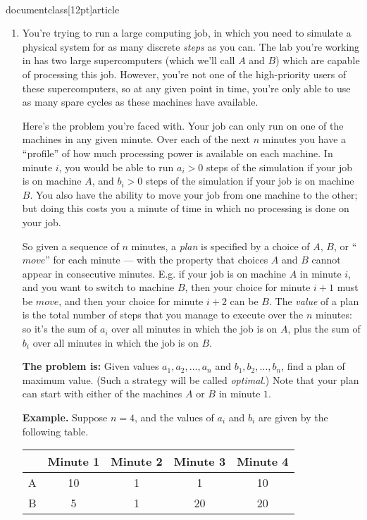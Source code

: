 \\documentclass[12pt]{article}
\begin{document}
\begin{enumerate}

\item

You're trying to run a large computing job, in which you
need to simulate a physical system for as many discrete
{\em steps} as you can.
The lab you're working in has two large supercomputers
(which we'll call $A$ and $B$) which are capable of
processing this job.
However, you're not one of the high-priority users of
these supercomputers, so at any given point in time,
you're only able to use as many spare cycles as these
machines have available.

Here's the problem you're faced with.
Your job can only run on one of the machines in any given minute.
Over each of the next $n$ minutes
you have a ``profile'' of how much processing power
is available on each machine.
In minute $i$, you would be able to run $a_i > 0 $ steps of
the simulation if your job is on machine $A$,
and $b_i > 0$ steps of the simulation if your job is on machine $B$.
You also have the ability to move your job from one machine
to the other; but doing this costs you a minute of time
in which no processing is done on your job.

So given a sequence of $n$ minutes, a {\em plan} is
specified by a choice of $A$, $B$, or ``$move$''
for each minute --- with the property that
choices $A$ and $B$ cannot appear in consecutive minutes.
E.g. if your job is on machine $A$ in minute $i$,
and you want to switch to machine $B$, then
your choice for minute $i+1$ must be $move$,
and then your choice for minute $i+2$ can be $B$.
The {\em value} of a plan is the total number of steps
that you manage to execute over the $n$ minutes:
so it's the sum of $a_i$ over all minutes in which the
job is on $A$, plus the sum of $b_i$ over all minutes
in which the job is on $B$.

\bigskip
\bigskip
{\bf The problem is:} Given values
$a_1, a_2, \ldots, a_n$ and $b_1, b_2, \ldots, b_n$,
find a plan of maximum value.
(Such a strategy will be called {\em optimal}.)
Note that your plan can start with either of the machines
$A$ or $B$ in minute $1$.

\bigskip
\bigskip
{\bf Example.}  Suppose $n = 4$, and the values of $a_i$ and $b_i$
are given by the following table.

\begin{table}[h]
\begin{center}
\begin{tabular}{|c||c|c|c|c|}
\hline & Minute 1 & Minute 2 & Minute 3 & Minute 4 \\ \hline
A & 10 & 1 & 1 & 10 \\ \hline
B & 5  & 1 & 20 & 20 \\ \hline
\end{tabular}
\end{center}
\end{table}


\end{enumerate}
\end{document}
